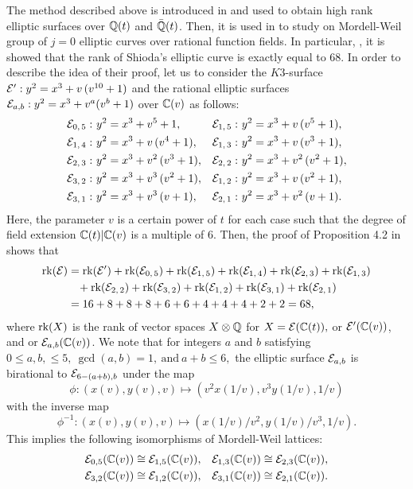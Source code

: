 \documentclass[11pt]{amsart}
\begin{document}
The method described 	above  is introduced in \cite{meijer}  and used to obtain high rank elliptic surfaces over ${\mathbb Q}(t) $ and $\bar{{\mathbb Q}}(t)$. 
Then, it is  used in \cites{Chahal2000, meijer} to study on Mordell-Weil group of $j=0$ elliptic curves over rational function fields. In particular, \cite{Chahal2000}, it is showed that the rank of Shioda's elliptic curve is exactly equal to $68$. 
In order to describe  the  idea of their proof, let us to consider the $K3$-surface ${\mathcal E}': y^2= x^3 + v\,(v^{10} + 1)$   and  
the rational elliptic surfaces ${\mathcal E}_{a, b}: y^2= x^3 + v^a (v^b+1)$ over ${\mathbb C}(v)$ as follows:
\begin{align}
		{\mathcal E}_{0,\, 5}:\ &  y^2= x^3 + v^5 + 1,  &  
		{\mathcal E}_{1,\, 5}:\ &  y^2= x^3 + v\,(v^5 + 1), \notag \\
		{\mathcal E}_{1,\, 4}:\ &  y^2= x^3 + v\,(v^4 + 1),  &  
		{\mathcal E}_{1,\, 3}:\ &  y^2= x^3 + v\,(v^3+1),   \notag \\
		{\mathcal E}_{2,\, 3}:\ &  y^2= x^3 + v^2\,(v^3+1), &
		{\mathcal E}_{2,\, 2}:\ &  y^2= x^3 + v^2\,(v^2+1),  \notag \\
		{\mathcal E}_{3,\, 2}:\ &  y^2= x^3 + v^3\,(v^2+1),  &
		{\mathcal E}_{1,\, 2}:\ &  y^2= x^3 + v \,(v^2+1),\notag \\
		{\mathcal E}_{3,\, 1}:\ &  y^2= x^3 + v^3\,(v+1),  &
		{\mathcal E}_{2,\, 1}:\ &  y^2= x^3 + v^2\,(v+1). 	\label{rak1}
\end{align}
Here, the parameter $v$ is a certain power of $t$ for each case such that the
degree of field extension ${\mathbb C}(t) | {\mathbb C}(v)$ is a multiple  of $6$. 
Then,   the  proof of Proposition 4.2 in \cite{Chahal2000} shows that
%
\begin{align}
		{\text{rk}} ({\mathcal E} ) & =   {\text{rk}} ({\mathcal E}')+{\text{rk}} ({\mathcal E}_{0,\, 5}) + {\text{rk}} ({\mathcal E}_{1,\, 5}) +{\text{rk}} ({\mathcal E}_{1,\, 4})+{\text{rk}} ({\mathcal E}_{2,\, 3})+{\text{rk}} ({\mathcal E}_{1,\, 3}) \notag \\ 
		& \hspace{0.3cm }+ {\text{rk}} ({\mathcal E}_{2,\, 2}) + {\text{rk}} ({\mathcal E}_{3,\, 2})+ {\text{rk}} ({\mathcal E}_{1,\, 2}) +{\text{rk}} ({\mathcal E}_{3,\, 1})+ {\text{rk}} ({\mathcal E}_{2,\, 1}) \notag \\ &=16+8 + 8 + 8 + 6 + 6 + 4 + 4 + 4 + 2 + 2=68, 	\label{rak2}
\end{align}
%
where ${\text{rk}} (X)$ is the rank of vector spaces $X \otimes {\mathbb Q}$  for 
$X= {\mathcal E} ({\mathbb C}(t)),$ or ${\mathcal E}'({\mathbb C}(v))$, and  or ${\mathcal E}_{a, b}({\mathbb C}(v))$.
We note that for  integers $a$ and $b$ satisfying
$0 \leq a, b, \leq 5, \ \gcd(a,b)=1, \ \text{and}\  a+b \leq 6, $
 the elliptic 
surface $ {\mathcal E}_{a, b}$   is birational to ${\mathcal E}_{6-(a+b), b}$   under the map
$$\phi:   (x(v), y(v), v) \mapsto \left( v^2 x(1/v) , v^3 y(1/v), 1/v \right)$$  with the  inverse map 
$$\phi^{-1}:   (x(v), y(v), v) \mapsto \left( x(1/v)/v^2  , y(1/v)/v^3, 1/v \right).$$
This implies the following isomorphisms of Mordell-Weil lattices:
\begin{align*}
	{\mathcal E}_{0, 5}({\mathbb C}(v))  \cong  {\mathcal E}_{1, 5}({\mathbb C}(v)),\quad & {\mathcal E}_{1, 3}({\mathbb C}(v)) \cong {\mathcal E}_{2,3}({\mathbb C}(v)),\\
	{\mathcal E}_{3, 2}({\mathbb C}(v))  \cong {\mathcal E}_{1, 2}({\mathbb C}(v)),\quad &  {\mathcal E}_{3, 1}({\mathbb C}(v))  \cong {\mathcal E}_{2, 1}({\mathbb C}(v)). 
\end{align*}
\end{document}
